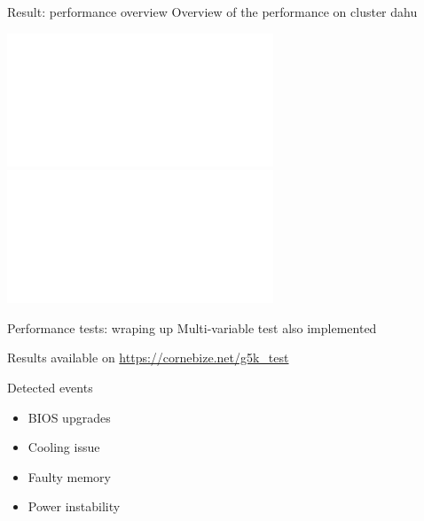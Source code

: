\documentclass[10pt]{beamer}
\begin{document}
\begin{frame}{Result: performance overview}
    Overview of the performance on cluster dahu \\
    \begin{center}
        \includegraphics<1>[width=0.9\linewidth]{img/slides/overview_dahu.pdf}
        \includegraphics<2>[width=0.9\linewidth]{img/slides/overview_windowed_dahu.pdf}
    \end{center}
\end{frame}

\begin{frame}{Performance tests: wraping up}
    Multi-variable test also implemented
    \pause

    Results available on \alert{\url{https://cornebize.net/g5k\_test}}

    \begin{minipage}{0.55\linewidth}
    \end{minipage} \hfill\pause%
    \begin{minipage}{0.4\linewidth}
        \begin{block}{Detected events}
            \begin{itemize}
                \item BIOS upgrades
                \item Cooling issue
                \item Faulty memory
                \item Power instability
            \end{itemize}
            \pause


\end{block}
\end{minipage}
\end{frame}
\end{document}
